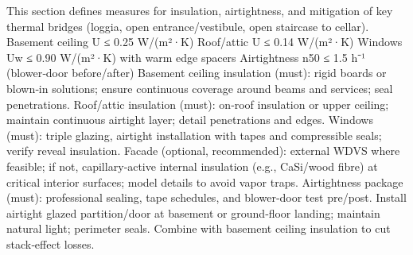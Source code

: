 \markdownRendererDocumentBegin
\markdownRendererSectionBegin
{}\markdownRendererInterblockSeparator
{}This section defines measures for insulation, airtightness, and mitigation of key thermal bridges (loggia, open entrance/vestibule, open staircase to cellar).\markdownRendererInterblockSeparator
{}\markdownRendererSectionBegin
{}\markdownRendererInterblockSeparator
{}\markdownRendererUlBeginTight
\markdownRendererUlItem Basement ceiling U ≤ 0.25 W/(m²·K)\markdownRendererUlItemEnd 
\markdownRendererUlItem Roof/attic U ≤ 0.14 W/(m²·K)\markdownRendererUlItemEnd 
\markdownRendererUlItem Windows Uw ≤ 0.90 W/(m²·K) with warm edge spacers\markdownRendererUlItemEnd 
\markdownRendererUlItem Airtightness n50 ≤ 1.5 h⁻¹ (blower‑door before/after)\markdownRendererUlItemEnd 
\markdownRendererUlEndTight \markdownRendererInterblockSeparator
{}
\markdownRendererSectionEnd \markdownRendererSectionBegin
{}\markdownRendererInterblockSeparator
{}\markdownRendererUlBeginTight
\markdownRendererUlItem Basement ceiling insulation (must): rigid boards or blown‑in solutions; ensure continuous coverage around beams and services; seal penetrations.\markdownRendererUlItemEnd 
\markdownRendererUlItem Roof/attic insulation (must): on‑roof insulation or upper ceiling; maintain continuous airtight layer; detail penetrations and edges.\markdownRendererUlItemEnd 
\markdownRendererUlItem Windows (must): triple glazing, airtight installation with tapes and compressible seals; verify reveal insulation.\markdownRendererUlItemEnd 
\markdownRendererUlItem Facade (optional, recommended): external WDVS where feasible; if not, capillary‑active internal insulation (e.g., CaSi/wood fibre) at critical interior surfaces; model details to avoid vapor traps.\markdownRendererUlItemEnd 
\markdownRendererUlItem Airtightness package (must): professional sealing, tape schedules, and blower‑door test pre/post.\markdownRendererUlItemEnd 
\markdownRendererUlEndTight \markdownRendererInterblockSeparator
{}
\markdownRendererSectionEnd \markdownRendererSectionBegin
{}\markdownRendererInterblockSeparator
{}\markdownRendererUlBeginTight
\markdownRendererUlItem Install airtight glazed partition/door at basement or ground‑floor landing; maintain natural light; perimeter seals.\markdownRendererUlItemEnd 
\markdownRendererUlItem Combine with basement ceiling insulation to cut stack‑effect losses.\markdownRendererUlItemEnd 
